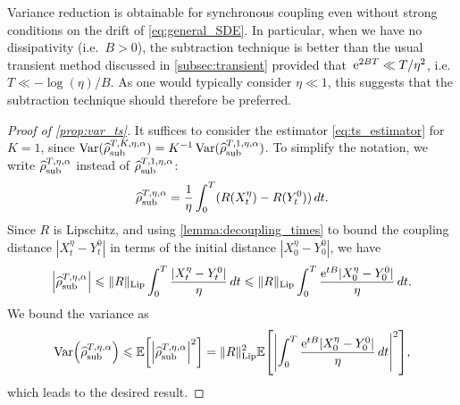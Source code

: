 \begin{remark}
	Variance reduction is obtainable for synchronous coupling even without strong conditions on the drift of \eqref{eq:general_SDE}. In particular, when we have no dissipativity (i.e.\ $B>0$), the subtraction technique is better than the usual transient method discussed in \cref{subsec:transient} provided that~$\mathrm{e}^{2BT} \ll T/\eta^2$, i.e.\ $T\ll -\log(\eta)/B$. As one would typically consider $\eta\ll 1$, this suggests that the subtraction technique should therefore be preferred. 
\end{remark}

\begin{proof}[Proof of \cref{prop:var_ts}]
It suffices to consider the estimator \eqref{eq:ts_estimator} for $K=1$, since $\operatorname{Var}(\widehat{\rho}^{T,K,\eta,\alpha}_{\rm sub}) = K^{-1}\operatorname{Var}(\widehat{\rho}^{T,1,\eta,\alpha}_{\rm sub})$. To simplify the notation, we write $\widehat{\rho}^{T,\eta,\alpha}_{\rm sub}$ instead of $\widehat{\rho}^{T,1,\eta,\alpha}_{\rm sub}$:
	\begin{equation}
		\widehat{\rho}^{T,\eta,\alpha}_{\rm sub} = \frac{1}{\eta}\int_0^T (R(X_t^\eta) - R(Y_t^0)) \, dt.
	\end{equation}
	Since $R$ is Lipschitz, and using \cref{lemma:decoupling_times} to bound the coupling distance $|X_t^\eta - Y_t^0|$ in terms of the initial distance $|X_0^\eta - Y_0^0|$, we have
	\begin{align}
		\label{eq:rhoLipschitz}
		\abs*{\asTSest} \leq \RLip \int_0^T \frac{|X_t^\eta - Y_t^0|}{\eta} \, dt \leq \RLip \int_0^T \frac{\e^{tB}|X_0^\eta - Y_0^0|}{\eta} \, dt.
	\end{align}
	We bound the variance as
	\begin{align}
		\Var\paren*{\asTSest} 
		\leq \E\bkt*{\abs*{\asTSest}^2} = \RLip^2\E\bkt*{\abs*{\int_0^T \frac{\e^{tB}|X_0^\eta - Y_0^0|}{\eta} \, dt}^2},
		\label{eq:var_integral_bound}
	\end{align}
	which leads to the desired result.
\end{proof}
